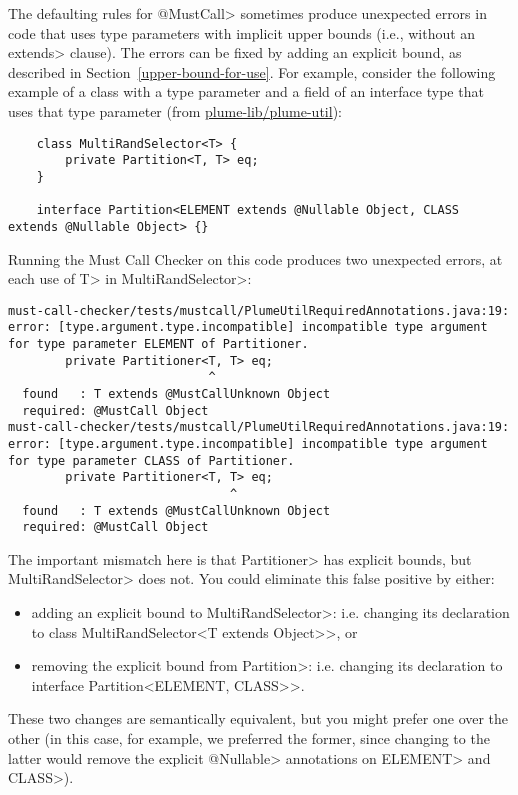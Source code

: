 
The defaulting rules for \<@MustCall> sometimes produce unexpected errors in code
that uses type parameters with implicit upper bounds (i.e., without an \<extends> clause).
The errors can be fixed by adding an explicit bound, as described in Section~\ref{upper-bound-for-use}.
For example, consider the following
example of a class with a type parameter and a field of an interface type that uses that
type parameter (from \href{https://github.com/plume-lib/plume-util}{plume-lib/plume-util}):
\begin{Verbatim}
    class MultiRandSelector<T> {
        private Partition<T, T> eq;
    }

    interface Partition<ELEMENT extends @Nullable Object, CLASS extends @Nullable Object> {}
\end{Verbatim}

Running the Must Call Checker on this code produces two unexpected errors, at each use
of \<T> in \<MultiRandSelector>:

\begin{Verbatim}
must-call-checker/tests/mustcall/PlumeUtilRequiredAnnotations.java:19: error: [type.argument.type.incompatible] incompatible type argument for type parameter ELEMENT of Partitioner.
        private Partitioner<T, T> eq;
                            ^
  found   : T extends @MustCallUnknown Object
  required: @MustCall Object
must-call-checker/tests/mustcall/PlumeUtilRequiredAnnotations.java:19: error: [type.argument.type.incompatible] incompatible type argument for type parameter CLASS of Partitioner.
        private Partitioner<T, T> eq;
                               ^
  found   : T extends @MustCallUnknown Object
  required: @MustCall Object
\end{Verbatim}

The important mismatch here is that \<Partitioner> has explicit bounds, but \<MultiRandSelector>
does not. You could eliminate this false positive by either:
\begin{itemize}
\item adding an explicit bound to \<MultiRandSelector>: i.e. changing its declaration to \<class MultiRandSelector<T extends Object>>, or
\item removing the explicit bound from \<Partition>: i.e. changing its declaration to \<interface Partition<ELEMENT, CLASS>>.
\end{itemize}

These two changes are semantically equivalent, but you might prefer one over the other (in this case, for example,
we preferred the former, since changing to the latter would remove the explicit \<@Nullable> annotations on
\<ELEMENT> and \<CLASS>).
